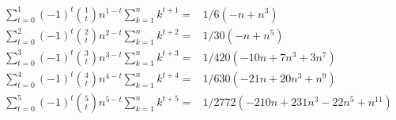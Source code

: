 \begin{equation*}
    \begin{split}
        \sum_{t=0}^{1} (-1)^t \binom{1}{t} n^{1-t} \sum_{k=1}^{n} k^{t+1} =& 1/6 (-n + n^3) \\
        \sum_{t=0}^{2} (-1)^t \binom{2}{t} n^{2-t} \sum_{k=1}^{n} k^{t+2} =& 1/30 (-n + n^5) \\
        \sum_{t=0}^{3} (-1)^t \binom{3}{t} n^{3-t} \sum_{k=1}^{n} k^{t+3} =& 1/420 (-10 n + 7 n^3 + 3 n^7) \\
        \sum_{t=0}^{4} (-1)^t \binom{4}{t} n^{4-t} \sum_{k=1}^{n} k^{t+4} =& 1/630 (-21 n + 20 n^3 + n^9) \\
        \sum_{t=0}^{5} (-1)^t \binom{5}{t} n^{5-t} \sum_{k=1}^{n} k^{t+5} =& 1/2772 (-210 n + 231 n^3 - 22 n^5 + n^{11}) \\
    \end{split}
\end{equation*}